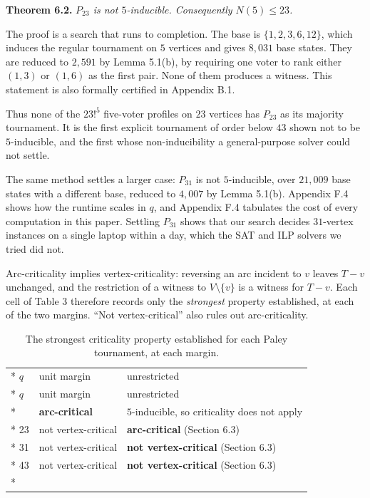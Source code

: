 \documentclass[
]{article}
\newcounter{none} %
\begin{document}
\textbf{Theorem 6.2.} \emph{\(P_{23}\) is not \(5\)-inducible.
Consequently \(N(5) \le 23\).}

The proof is a search that runs to completion. The base is
\(\{1,2,3,6,12\}\), which induces the regular tournament on \(5\)
vertices and gives \(8{,}031\) base states. They are reduced to
\(2{,}591\) by Lemma 5.1(b), by requiring one voter to rank either
\((1,3)\) or \((1,6)\) as the first pair. None of them produces a
witness. This statement is also formally certified in Appendix B.1.

Thus none of the \(23!^{5}\) five-voter profiles on \(23\) vertices has
\(P_{23}\) as its majority tournament. It is the first explicit
tournament of order below \(43\) shown not to be \(5\)-inducible, and
the first whose non-inducibility a general-purpose solver could not
settle.

The same method settles a larger case: \(P_{31}\) is not
\(5\)-inducible, over \(21{,}009\) base states with a different base,
reduced to \(4{,}007\) by Lemma 5.1(b). Appendix F.4 shows how the
runtime scales in \(q\), and Appendix F.4 tabulates the cost of every
computation in this paper. Settling \(P_{31}\) shows that our search
decides \(31\)-vertex instances on a single laptop within a day, which
the SAT and ILP solvers we tried did not.

Arc-criticality implies vertex-criticality: reversing an arc incident to
\(v\) leaves \(T - v\) unchanged, and the restriction of a witness to
\(V \setminus \{v\}\) is a witness for \(T - v\). Each cell of Table 3
therefore records only the \emph{strongest} property established, at
each of the two margins. ``Not vertex-critical'' also rules out
arc-criticality.

\begin{longtable}[]{@{}lll@{}}
\caption{The strongest criticality property established for each Paley
tournament, at each margin.}\tabularnewline*
\toprule\noalign{}
\(q\) & unit margin & unrestricted \\*
\midrule\noalign{}
\endfirsthead
\toprule\noalign{}
\(q\) & unit margin & unrestricted \\*
\midrule\noalign{}
\endhead
\bottomrule\noalign{}
\endlastfoot
19 & \textbf{arc-critical} & \(5\)-inducible, so criticality does not
apply \\*
23 & not vertex-critical & \textbf{arc-critical} (Section 6.3) \\*
31 & not vertex-critical & \textbf{not vertex-critical} (Section 6.3) \\*
43 & not vertex-critical & \textbf{not vertex-critical} (Section 6.3) \\*
\end{longtable}
\end{document}

